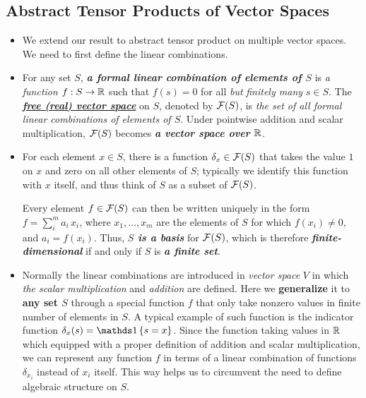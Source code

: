 \documentclass[11pt]{article}
\begin{document}
\subsection{Abstract Tensor Products of Vector Spaces}
\begin{itemize}
\item We extend our result to abstract tensor product on multiple vector spaces. We need to first define the linear combinations.

\item \begin{definition}
For any set $S$, \emph{\textbf{a formal linear combination of elements of $S$}} is \emph{a function} $f: S \rightarrow {\mathbb R}$ such that $f(s) = 0$ for all \emph{but} \emph{finitely many} $s \in S$. The \underline{\emph{\textbf{free (real) vector space}}} on $S$, denoted by ${\mathcal F}(S)$, is \emph{the set of all formal linear combinations of elements of $S$}. Under pointwise addition and scalar multiplication, ${\mathcal F}(S)$ becomes \emph{\textbf{a vector space over ${\mathbb R}$}}.
\end{definition}

\item \begin{remark}
For each element $x \in S$, there is a function $\delta_{x} \in {\mathcal F}(S)$ that takes the value $1$ on $x$ and zero on all other elements of $S$; typically we identify this function with $x$ itself, and thus think of $S$ as a subset of ${\mathcal F}(S)$. 

Every element $f \in {\mathcal F}(S)$ can then be written uniquely in the form $f = \sum_i^{m}a_i\,x_i$, where $x_1,\ldots, x_m$ are the elements of $S$ for which $f(x_i) \neq 0$, and $a_i = f(x_i)$. Thus, \emph{\textbf{$S$ is a basis}} for ${\mathcal F}(S)$, which is therefore \emph{\textbf{finite-dimensional}} if and only if $S$ is \emph{\textbf{a finite set}}. 
\end{remark}

\item \begin{remark}
Normally the linear combinations are introduced in \emph{vector space} $V$ in which \emph{the scalar multiplication} and \emph{addition} are defined. Here we \textbf{generalize} it to \textbf{any set $S$} through a special function $f$ that only take nonzero values in finite number of elements in $S$. A typical example of such function is the indicator function $\delta_x(s) = \ind{s= x}$. Since the function taking values in ${\mathbb R}$ which equipped with a proper definition of addition and scalar multiplication, we can represent any function $f$ in terms of a linear combination of functions $\delta_{x_i}$ instead of $x_i$ itself. This way helps us to circumvent the need to define algebraic structure on $S$.
\end{remark}


\end{itemize}
\end{document}
